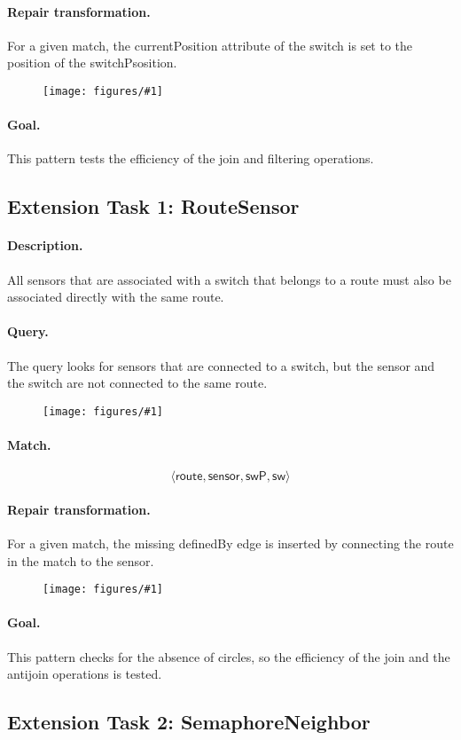 \documentclass[submission,copyright,creativecommons]{eptcs}
\newcommand{\ttcpattern}[1]{
\begin{figure}[H] 
	\centering
	\texttt{[image: figures/\#1]}
\end{figure}}
\begin{document}
\paragraph{Repair transformation.} For a given match, the \textsf{currentPosition} attribute of the \textsf{switch} is set to the \textsf{position} of the \textsf{switchPsosition}. 
\ttcpattern{transformation-switchset}
\paragraph{Goal.} This pattern tests the efficiency of the join and filtering operations.


\subsection{Extension Task 1: RouteSensor}
\label{routesensor}
\paragraph{Description.} All sensors that are associated with a switch that belongs to a route must also be associated directly with the same route.
\paragraph{Query.} The query looks for sensors that are connected to a switch, but the sensor and the switch are not connected to the same route.
\ttcpattern{pattern-routesensor}
\paragraph{Match.} $$\langle \mathsf{route}, \mathsf{sensor}, \mathsf{swP}, \mathsf{sw} \rangle$$
\paragraph{Repair transformation.} For a given match, the missing \textsf{definedBy} edge is inserted by connecting the \textsf{route} in the match to the \textsf{sensor}.
\ttcpattern{transformation-routesensor}
\paragraph{Goal.} This pattern checks for the absence of circles, so the efficiency of the join and the antijoin operations is tested.


\subsection{Extension Task 2: SemaphoreNeighbor}
\label{semaphoreneighbor}
\end{document}
